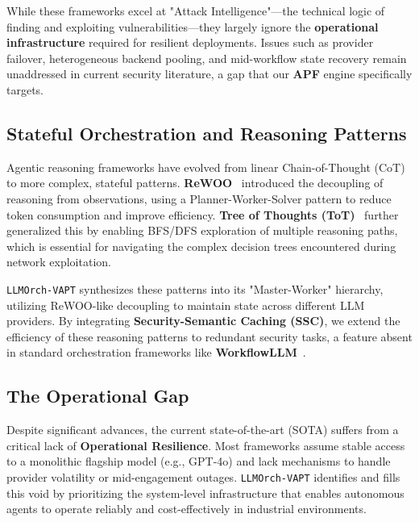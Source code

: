 While these frameworks excel at "Attack Intelligence"—the technical logic of finding and exploiting vulnerabilities—they largely ignore the \textbf{operational infrastructure} required for resilient deployments. Issues such as provider failover, heterogeneous backend pooling, and mid-workflow state recovery remain unaddressed in current security literature, a gap that our \textbf{APF} engine specifically targets.

\subsection{Stateful Orchestration and Reasoning Patterns}
Agentic reasoning frameworks have evolved from linear Chain-of-Thought (CoT) to more complex, stateful patterns. \textbf{ReWOO}~\cite{rewoo} introduced the decoupling of reasoning from observations, using a Planner-Worker-Solver pattern to reduce token consumption and improve efficiency. \textbf{Tree of Thoughts (ToT)}~\cite{tot} further generalized this by enabling BFS/DFS exploration of multiple reasoning paths, which is essential for navigating the complex decision trees encountered during network exploitation.

\texttt{LLMOrch-VAPT} synthesizes these patterns into its "Master-Worker" hierarchy, utilizing ReWOO-like decoupling to maintain state across different LLM providers. By integrating \textbf{Security-Semantic Caching (SSC)}, we extend the efficiency of these reasoning patterns to redundant security tasks, a feature absent in standard orchestration frameworks like \textbf{WorkflowLLM}~\cite{workflowllm}.

\subsection{The Operational Gap}
Despite significant advances, the current state-of-the-art (SOTA) suffers from a critical lack of \textbf{Operational Resilience}. Most frameworks assume stable access to a monolithic flagship model (e.g., GPT-4o) and lack mechanisms to handle provider volatility or mid-engagement outages. \texttt{LLMOrch-VAPT} identifies and fills this void by prioritizing the system-level infrastructure that enables autonomous agents to operate reliably and cost-effectively in industrial environments.
